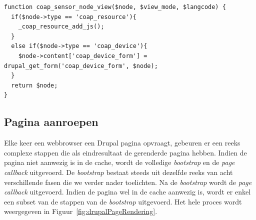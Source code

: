 \scriptsize
\lstset{language=PHP}
\begin{lstlisting}[label=lst:drupalHookExample,caption=Implementatie van hook\_node\_view door de module coap\_resource]
function coap_sensor_node_view($node, $view_mode, $langcode) {
  if($node->type == 'coap_resource'){
    _coap_resource_add_js();
  }
  else if($node->type == 'coap_device'){
    $node->content['coap_device_form'] = drupal_get_form('coap_device_form', $node);
  }
  return $node;
}
\end{lstlisting}
\normalsize

\subsection{Pagina aanroepen}
Elke keer een webbrowser een Drupal pagina opvraagt, gebeuren er een reeks complexe stappen die als eindresultaat de gerenderde pagina hebben. Indien de pagina niet aanwezig is in de cache, wordt de volledige \textit{bootstrap} en de \textit{page callback} uitgevoerd. De \textit{bootstrap} bestaat steeds uit dezelfde reeks van acht verschillende fasen die we verder nader toelichten. Na de \textit{bootstrap} wordt de \textit{page callback} uitgevoerd. Indien de pagina wel in de cache aanwezig is, wordt er enkel een subset van de stappen van de \textit{bootstrap} uitgevoerd. Het hele proces wordt weergegeven in Figuur~\ref{fig:drupalPageRendering}.

